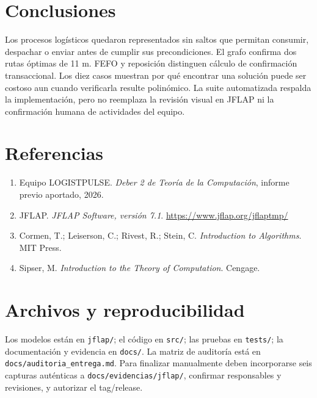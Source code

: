 \documentclass[11pt,a4paper]{article}
\newcommand{\code}[1]{\texttt{#1}}
\begin{document}
\section{Conclusiones}

Los procesos logísticos quedaron representados sin saltos que permitan consumir, despachar o enviar antes de cumplir sus precondiciones. El grafo confirma dos rutas óptimas de 11 m. FEFO y reposición distinguen cálculo de confirmación transaccional. Los diez casos muestran por qué encontrar una solución puede ser costoso aun cuando verificarla resulte polinómico. La suite automatizada respalda la implementación, pero no reemplaza la revisión visual en JFLAP ni la confirmación humana de actividades del equipo.

\section*{Referencias}
\begin{enumerate}
\item Equipo LOGISTPULSE. \emph{Deber 2 de Teoría de la Computación}, informe previo aportado, 2026.
\item JFLAP. \emph{JFLAP Software, versión 7.1}. \url{https://www.jflap.org/jflaptmp/}
\item Cormen, T.; Leiserson, C.; Rivest, R.; Stein, C. \emph{Introduction to Algorithms}. MIT Press.
\item Sipser, M. \emph{Introduction to the Theory of Computation}. Cengage.
\end{enumerate}

\appendix
\section{Archivos y reproducibilidad}

Los modelos están en \code{jflap/}; el código en \code{src/}; las pruebas en \code{tests/}; la documentación y evidencia en \code{docs/}. La matriz de auditoría está en \code{docs/auditoria\_entrega.md}. Para finalizar manualmente deben incorporarse seis capturas auténticas a \code{docs/evidencias/jflap/}, confirmar responsables y revisiones, y autorizar el tag/release.
\end{document}
